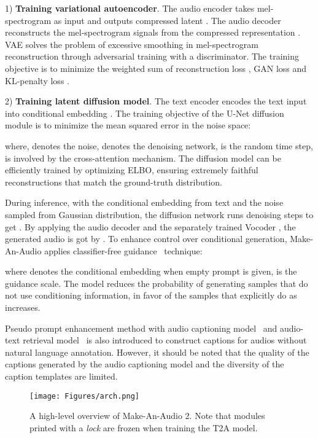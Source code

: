 \documentclass{article}
\begin{document}
1) \textbf{Training variational autoencoder}. The audio encoder  takes mel-spectrogram  as input and outputs compressed latent . The audio decoder  reconstructs the mel-spectrogram signals  from the compressed representation . VAE solves the problem of excessive smoothing in mel-spectrogram reconstruction through adversarial training with a discriminator. The training objective is to minimize the weighted sum of reconstruction loss , GAN loss  and KL-penalty loss . 
  
2) \textbf{Training latent diffusion model}. The text encoder  encodes the text input  into conditional embedding .  The training objective of the U-Net diffusion module is to minimize the mean squared error in the noise space:

where,  denotes the noise,  denotes the denoising network,  is the random time step,  is involved by the cross-attention mechanism. The diffusion model can be efficiently trained by optimizing ELBO, ensuring extremely faithful reconstructions that match the ground-truth distribution. 

During inference, with the conditional embedding  from text and the noise  sampled from Gaussian distribution, the diffusion network runs denoising steps to get . By applying the audio decoder  and the separately trained Vocoder , the generated audio is got by . To enhance control over conditional generation, Make-An-Audio applies classifier-free guidance~\cite{ho2021classifier} technique:

where  denotes the conditional embedding when empty prompt is given,  is the guidance scale. The model reduces the probability of generating samples that do not use conditioning information, in favor of the samples that explicitly do as  increases. 

Pseudo prompt enhancement method with audio captioning model~\cite{xu2020crnn} and audio-text retrieval model~\cite{koepke2022audio} is also introduced to construct captions for audios without natural language annotation. However, it should be noted that the quality of the captions generated by the audio captioning model and the diversity of the caption templates are limited.

\begin{figure*}[!t]
    \centering
    \texttt{[image: Figures/arch.png]}
    \caption{A high-level overview of Make-An-Audio 2. Note that modules printed with a \textit{lock} are frozen when training the T2A model.} 
    \label{fig:arch}
\end{figure*}
\end{document}

